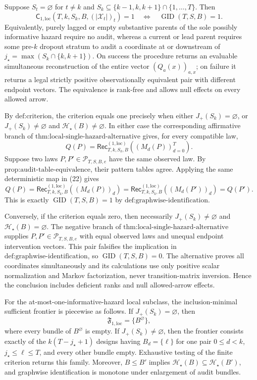 Suppose \(S_t=\varnothing\) for \(t\ne k\) and
\(S_k\subseteq\{k-1,k,k+1\}\cap\{1,\ldots,T\}\).  Then
\[
\mathsf C_{1,\mathrm{loc}}(T,k,S_k,B,(|\mathcal X_t|)_t)=1
\quad\Longleftrightarrow\quad
\operatorname{GID}(T,S,B)=1.
\]
Equivalently, purely lagged or empty substantive parents of the sole possibly informative hazard require no audit, whereas a current or lead parent requires some pre-\(k\) dropout stratum to audit a coordinate at or downstream of \(j_\star=\max(S_k\cap\{k,k+1\})\).  On success the procedure returns an evaluable simultaneous reconstruction of the entire vector \((Q_a(x))_{a,x}\); on failure it returns a legal strictly positive observationally equivalent pair with different endpoint vectors.  The equivalence is rank-free and allows null effects on every allowed arrow.

By \(\text{def:criterion}\), the criterion equals one precisely when either
\(J_+(S_k)=\varnothing\), or \(J_+(S_k)\ne\varnothing\) and
\(\mathcal H_\star(B)\ne\varnothing\).  In either case the corresponding affirmative branch of \(\text{thm:local-single-hazard-alternative}\) gives, for every compatible law,
\[
Q(P)=\mathsf{Rec}^{(1,\mathrm{loc})}_{T,k,S_k,B}((M_d(P))_{d=0}^T).
\tag{22}
\]
Suppose two laws \(P,P'\in\mathcal P_{T,S,B,e}\) have the same observed law.  By \(\text{prop:audit-table-equivalence}\), their pattern tables agree.  Applying the same deterministic map in (22) gives
\[
Q(P)=\mathsf{Rec}^{(1,\mathrm{loc})}_{T,k,S_k,B}((M_d(P))_d)
=\mathsf{Rec}^{(1,\mathrm{loc})}_{T,k,S_k,B}((M_d(P'))_d)=Q(P').
\]
This is exactly \(\operatorname{GID}(T,S,B)=1\) by
\(\text{def:graphwise-identification}\).

Conversely, if the criterion equals zero, then necessarily
\(J_+(S_k)\ne\varnothing\) and \(\mathcal H_\star(B)=\varnothing\).  The negative branch of \(\text{thm:local-single-hazard-alternative}\) supplies
\(P,P'\in\mathcal P_{T,S,B,e}\) with equal observed laws and unequal endpoint intervention vectors.  This pair falsifies the implication in
\(\text{def:graphwise-identification}\), so \(\operatorname{GID}(T,S,B)=0\).  The alternative proves all coordinates simultaneously and its calculations use only positive scalar normalization and Markov factorization, never transition-matrix inversion.  Hence the conclusion includes deficient ranks and null allowed-arrow effects.

For the at-most-one-informative-hazard local subclass, the inclusion-minimal sufficient frontier is piecewise as follows.  If \(J_+(S_k)=\varnothing\), then
\[
\mathfrak F_{1,\mathrm{loc}}=\{B^\varnothing\},
\]
where every bundle of \(B^\varnothing\) is empty.  If
\(J_+(S_k)\ne\varnothing\), then the frontier consists exactly of the
\(k(T-j_\star+1)\) designs having \(B_d=\{\ell\}\) for one pair
\(0\le d<k\), \(j_\star\le\ell\le T\), and every other bundle empty.  Exhaustive testing of the finite criterion returns this family.  Moreover,
\(B\le B'\) implies \(\mathcal H_\star(B)\subseteq\mathcal H_\star(B')\), and graphwise identification is monotone under enlargement of audit bundles.

